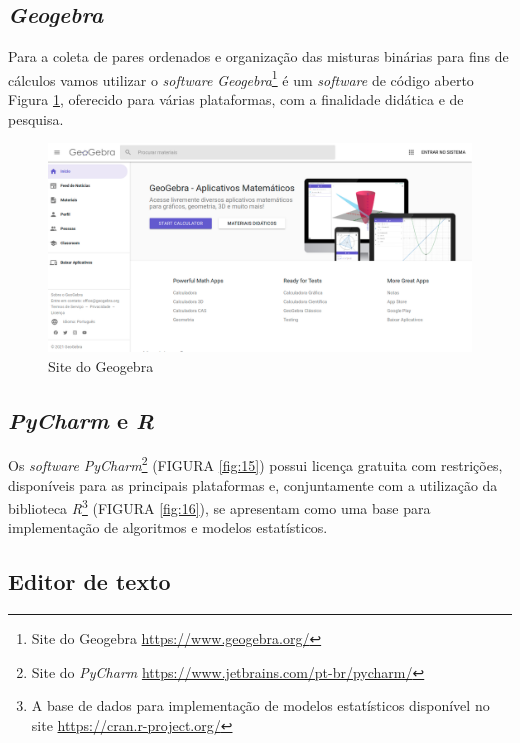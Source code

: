 \subsection{\textit{Geogebra}}
Para a coleta de pares ordenados e organização das misturas binárias para fins de cálculos vamos utilizar o \textit{software} \textit{Geogebra}\footnote{Site do Geogebra \url{https://www.geogebra.org/}} é um \textit{software} de código aberto Figura \ref{fig:11}, oferecido para várias plataformas, com a finalidade didática e de pesquisa. 
\begin{figure}[H]
	\centering
	\includegraphics[width=0.9\linewidth 
	]{dados/figuras/Geogebra_1.png}
	\caption[Site do Geogebra]{Site do Geogebra}
	\label{fig:11}
\end{figure}


\subsection{\textit{PyCharm} e \textit{R}}

Os \textit{software} \textit{PyCharm}\footnote{Site do \textit{PyCharm} \url{https://www.jetbrains.com/pt-br/pycharm/}} (FIGURA \ref{fig:15}) possui licença gratuita com restrições, disponíveis para as principais plataformas e, conjuntamente com a utilização da biblioteca \textit{R}\footnote{A base de dados para implementação de modelos estatísticos disponível no site \url{https://cran.r-project.org/}} (FIGURA \ref{fig:16}), se apresentam como uma base para implementação de algoritmos e modelos estatísticos. 



\subsection{Editor de texto \LaTeXe}

